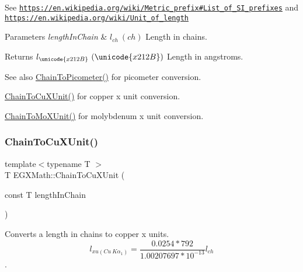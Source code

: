 See \href{https://en.wikipedia.org/wiki/Metric_prefix#List_of_SI_prefixes}{\tt https\+://en.\+wikipedia.\+org/wiki/\+Metric\+\_\+prefix\#\+List\+\_\+of\+\_\+\+S\+I\+\_\+prefixes} and \href{https://en.wikipedia.org/wiki/Unit_of_length}{\tt https\+://en.\+wikipedia.\+org/wiki/\+Unit\+\_\+of\+\_\+length} 
\begin{DoxyParams}{Parameters}
{\em length\+In\+Chain} & $ l_{ch}\ (ch)$ Length in chains. \\
\hline
\end{DoxyParams}
\begin{DoxyReturn}{Returns}
$ l_{\unicode{x212B}}\ (\unicode{x212B})$ Length in angstroms. 
\end{DoxyReturn}
\begin{DoxySeeAlso}{See also}
\mbox{\hyperlink{group___e_g_x_math-_conversions-_length_conversions-_imperial-_chain-_s_i_ga27f06f3f63727a16e02afaf8f01f4b45}{Chain\+To\+Picometer()}} for picometer conversion. 

\mbox{\hyperlink{group___e_g_x_math-_conversions-_length_conversions-_imperial-_chain-_non-_s_i_ga4d49e29ef32b64b7a433ffe76447cf5f}{Chain\+To\+Cu\+X\+Unit()}} for copper x unit conversion. 

\mbox{\hyperlink{group___e_g_x_math-_conversions-_length_conversions-_imperial-_chain-_non-_s_i_gae4a2b99d846db53416e9fc5d6f9e957c}{Chain\+To\+Mo\+X\+Unit()}} for molybdenum x unit conversion. 
\end{DoxySeeAlso}
\mbox{\label{group___e_g_x_math-_conversions-_length_conversions-_imperial-_chain-_non-_s_i_ga4d49e29ef32b64b7a433ffe76447cf5f}} 
\subsubsection{\texorpdfstring{Chain\+To\+Cu\+X\+Unit()}{ChainToCuXUnit()}}
{\footnotesize\ttfamily template$<$typename T $>$ \\
T E\+G\+X\+Math\+::\+Chain\+To\+Cu\+X\+Unit (\begin{DoxyParamCaption}\item[{const T}]{length\+In\+Chain }\end{DoxyParamCaption})}



Converts a length in chains to copper x units. \[ l_{xu(Cu\ K\alpha_1)}=\frac{0.0254 * 792}{1.00207697*10^{-13}} l_{ch}\]. 


